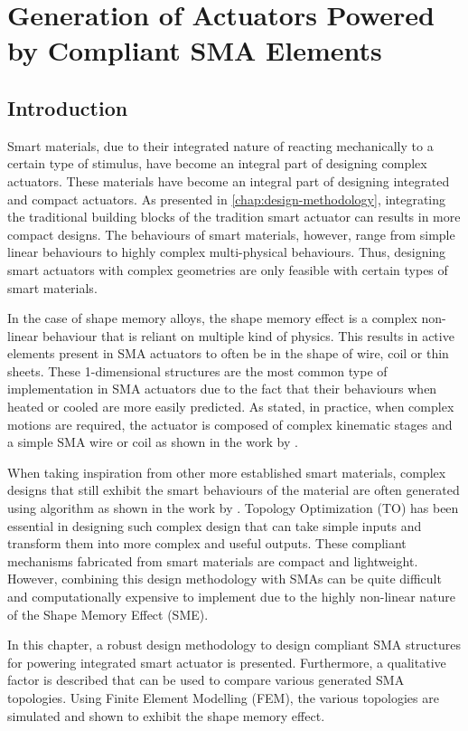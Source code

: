 
\chapter{Generation of Actuators Powered by Compliant SMA Elements}\label{chap:compliant-sma}
\section{Introduction}
Smart materials, due to their integrated nature of reacting mechanically to a certain type of stimulus, have become an integral part of designing complex actuators. These materials have become an integral part of designing integrated and compact actuators. As presented in \cref{chap:design-methodology}, integrating the traditional building blocks of the tradition smart actuator can results in more compact designs. The behaviours of smart materials, however, range from simple linear behaviours to highly complex multi-physical behaviours. Thus, designing smart actuators with complex geometries are only feasible with certain types of smart materials.

In the case of shape memory alloys, the shape memory effect is a complex non-linear behaviour that is reliant on multiple kind of physics. This results in active elements present in SMA actuators to often be in the shape of wire, coil or thin sheets. These 1-dimensional structures are the most common type of implementation in SMA actuators due to the fact that their behaviours when heated or cooled are more easily predicted. As stated, in practice, when complex motions are required, the actuator is composed of complex kinematic stages and a simple SMA wire or coil as shown in the work by \todocite.

When taking inspiration from other more established smart materials, complex designs that still exhibit the smart behaviours of the material are often generated using algorithm as shown in the work by \todocite. Topology Optimization (TO) has been essential in designing such complex design that can take simple inputs and transform them into more complex and useful outputs. These compliant mechanisms fabricated from smart materials are compact and lightweight. However, combining this design methodology with SMAs can be quite difficult and computationally expensive to implement due to the highly non-linear nature of the Shape Memory Effect (SME).

In this chapter, a robust design methodology to design compliant SMA structures for powering integrated smart actuator is presented. Furthermore, a qualitative factor is described that can be used to compare various generated SMA topologies. Using Finite Element Modelling (FEM), the various topologies are simulated and shown to exhibit the shape memory effect.

